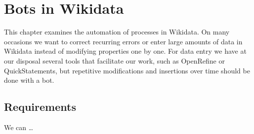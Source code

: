 
\chapter{Bots in Wikidata}

This chapter examines the automation of processes in Wikidata. On many occasions we want 
to correct recurring errors or enter large amounts of data in Wikidata instead of modifying 
properties one by one. For data entry we have at our disposal several tools that facilitate our 
work, such as OpenRefine or QuickStatements, but repetitive modifications and insertions over 
time should be done with a bot.


\section{Requirements}

We can \dots


